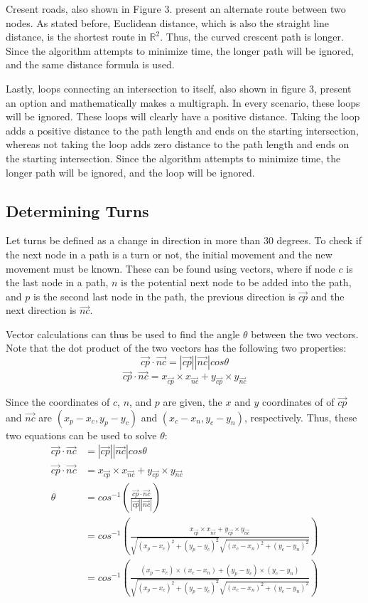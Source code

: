 \documentclass[letter,10pt]{article}
\begin{document}
Cresent roads, also shown in Figure 3. present an alternate route between two nodes. As stated before, Euclidean distance, which is also the straight line distance, is the shortest route in $\mathbb{R}^2$. Thus, the curved crescent path is longer. Since the algorithm attempts to minimize time, the longer path will be ignored, and the same distance formula is used.

Lastly, loops connecting an intersection to itself, also shown in figure 3, present an option and mathematically makes a multigraph. In every scenario, these loops will be ignored. These loops will clearly have a positive distance. Taking the loop adds a positive distance to the path length and ends on the starting intersection, whereas not taking the loop adds zero distance to the path length and ends on the starting intersection. Since the algorithm attempts to minimize time, the longer path will be ignored, and the loop will be ignored. 

\subsection*{Determining Turns}

Let turns be defined as a change in direction in more than 30 degrees. To check if the next node in a path is a turn or not, the initial movement and the new movement must be known. These can be found using vectors, where if node $c$ is the last node in a path, $n$ is the potential next node to be added into the path, and $p$ is the second last node in the path, the previous direction is $\vec{cp}$ and the next direction is $\vec{nc}$.

Vector calculations can thus be used to find the angle $\theta$ between the two vectors. Note that the dot product of the two vectors has the following two properties:
$$\vec{cp} \cdot \vec{nc} = |\vec{cp}|| \vec{nc} |cos\theta$$
$$\vec{cp} \cdot \vec{nc} = x_{\vec{cp}} \times  x_{\vec{nc}}+ y_{\vec{cp}} \times  y_{\vec{nc}} $$

Since the coordinates of $c$, $n$, and $p$ are given, the $x$ and $y$ coordinates of of $\vec{cp}$ and $\vec{nc}$ are $(x_p - x_c, y_p - y_c)$ and $(x_c - x_n, y_c - y_n)$, respectively. Thus, these two equations can be used to solve $\theta$:
\begin{align*}
\vec{cp} \cdot \vec{nc} &= |\vec{cp}|| \vec{nc} |cos\theta\\
\vec{cp} \cdot \vec{nc} &= x_{\vec{cp}} \times  x_{\vec{nc}}+ y_{\vec{cp}} \times  y_{\vec{nc}}\\
\theta &= cos^{-1} (\frac{\vec{cp} \cdot \vec{nc}}{|\vec{cp}|| \vec{nc} |})\\
&= cos^{-1} (\frac{x_{\vec{cp}} \times  x_{\vec{nc}}+ y_{\vec{cp}} \times  y_{\vec{nc}}}{\sqrt{(x_p - x_c)^2 + (y_p - y_c)^2}\sqrt{(x_c - x_n)^2 + (y_c - y_n)^2}})\\
&= cos^{-1} (\frac{(x_p - x_c) \times  (x_c - x_n)+ (y_p - y_c) \times  (y_c - y_n)}{\sqrt{(x_p - x_c)^2 + (y_p - y_c)^2}\sqrt{(x_c - x_n)^2 + (y_c - y_n)^2}})\\
\end{align*}
\end{document}
